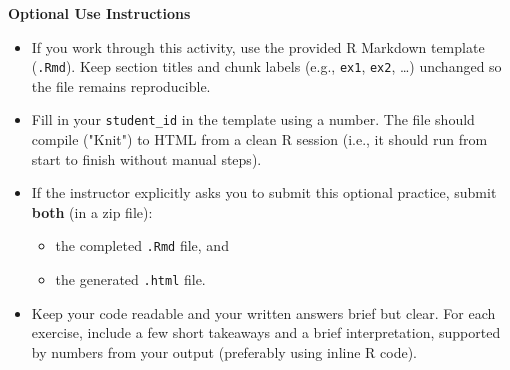 \documentclass[12pt]{article}
\begin{document}
\begin{center}
    \textbf{Optional Use Instructions}    
\end{center}

\begin{itemize}
    \item If you work through this activity, use the provided R Markdown template (\texttt{.Rmd}). Keep section titles and chunk labels (e.g., \texttt{ex1}, \texttt{ex2}, \dots) unchanged so the file remains reproducible.
    \item Fill in your \texttt{student\_id} in the template using a number. The file should compile ("Knit") to HTML from a clean R session (i.e., it should run from start to finish without manual steps).
    \item If the instructor explicitly asks you to submit this optional practice, submit \textbf{both} (in a zip file):
    \begin{itemize}
        \item the completed \texttt{.Rmd} file, and
        \item the generated \texttt{.html} file.
    \end{itemize}
    \item Keep your code readable and your written answers brief but clear. For each exercise, include a few short takeaways and a brief interpretation, supported by numbers from your output (preferably using inline R code).
\end{itemize}
\end{document}
